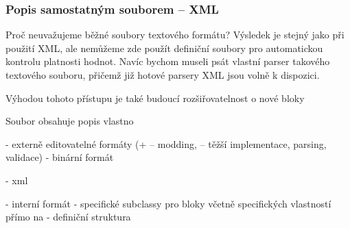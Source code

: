 \subsubsection{Popis samostatným souborem -- XML}
Proč neuvažujeme běžné soubory textového formátu? Výsledek je stejný jako při použití XML, ale nemůžeme zde použít definiční soubory pro automatickou kontrolu platnosti hodnot. Navíc bychom museli psát vlastní parser takového textového souboru, přičemž již hotové parsery XML jsou volně k dispozici. 

Výhodou tohoto přístupu je také budoucí rozšiřovatelnost o nové bloky

Soubor obsahuje popis vlastno

- externě editovatelné formáty (+ -- modding, -- těžší implementace, parsing, validace)
- binární formát

- xml


- interní formát
- specifické subclassy pro bloky včetně specifických vlastností přímo na 
- definiční struktura






